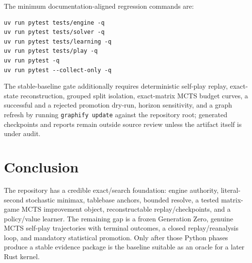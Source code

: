 \documentclass[11pt]{article}
\begin{document}
The minimum documentation-aligned regression commands are:

\begin{verbatim}
uv run pytest tests/engine -q
uv run pytest tests/solver -q
uv run pytest tests/learning -q
uv run pytest tests/play -q
uv run pytest -q
uv run pytest --collect-only -q
\end{verbatim}

The stable-baseline gate additionally requires deterministic self-play replay,
exact-state reconstruction, grouped split isolation, exact-matrix MCTS budget
curves, a successful and a rejected promotion dry-run, horizon sensitivity,
and a graph refresh by running \texttt{graphify update} against the repository
root; generated
checkpoints and reports remain outside source review unless the artifact itself
is under audit.

\section{Conclusion}

The repository has a credible exact/search foundation: engine authority,
literal-second stochastic minimax, tablebase anchors, bounded resolve, a tested
matrix-game MCTS improvement object, reconstructable replay/checkpoints, and a
policy/value learner. The remaining gap is a frozen Generation Zero, genuine
MCTS self-play trajectories with terminal outcomes, a closed replay/reanalysis
loop, and mandatory statistical promotion. Only after those Python phases
produce a stable evidence package is the baseline suitable as an oracle for a
later Rust kernel.
\end{document}
